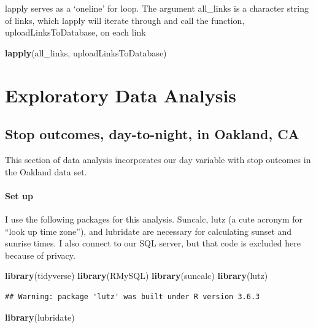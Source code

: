 \documentclass[
]{book}
\newenvironment{Shaded}{\begin{snugshade}}{\end{snugshade}}
\newcommand{\KeywordTok}[1]{\textcolor[rgb]{0.13,0.29,0.53}{\textbf{#1}}}
\newcommand{\NormalTok}[1]{#1}
\begin{document}
lapply serves as a `oneline' for loop. The argument all\_links is a character string of links, which lapply will iterate through and call the function, uploadLinksToDatabase, on each link

\begin{Shaded}
\begin{Highlighting}[]
\KeywordTok{lapply}\NormalTok{(all_links, uploadLinksToDatabase)}
\end{Highlighting}
\end{Shaded}

\hypertarget{exploratory-data-analysis}{%
\chapter{Exploratory Data Analysis}\label{exploratory-data-analysis}}

\hypertarget{stop-outcomes-day-to-night-in-oakland-ca}{%
\section{Stop outcomes, day-to-night, in Oakland, CA}\label{stop-outcomes-day-to-night-in-oakland-ca}}

This section of data analysis incorporates our day variable with stop outcomes in the Oakland data set.

\hypertarget{set-up}{%
\subsubsection{Set up}\label{set-up}}

I use the following packages for this analysis. Suncalc, lutz (a cute acronym for ``look up time zone''), and lubridate are necessary for calculating sunset and sunrise times. I also connect to our SQL server, but that code is excluded here because of privacy.

\begin{Shaded}
\begin{Highlighting}[]
\KeywordTok{library}\NormalTok{(tidyverse)}
\KeywordTok{library}\NormalTok{(RMySQL)}
\KeywordTok{library}\NormalTok{(suncalc)}
\KeywordTok{library}\NormalTok{(lutz)}
\end{Highlighting}
\end{Shaded}

\begin{verbatim}
## Warning: package 'lutz' was built under R version 3.6.3
\end{verbatim}

\begin{Shaded}
\begin{Highlighting}[]
\KeywordTok{library}\NormalTok{(lubridate)}
\end{Highlighting}
\end{Shaded}
\end{document}
